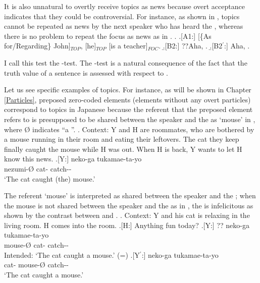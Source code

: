 It is also unnatural to overtly receive topics as news
because overt acceptance indicates that they could be controversial.
For instance, as shown in \Next[B2],
topics cannot be repeated as news by the next speaker who has heard the  \Next[A1],
whereas there is no problem to repeat the focus as news as in \Next[B2$^{\prime}$].
%
\ex.\label{aha} \a.[A1:] [\{As for/Regarding\} John]$_{TOP}$, [he]$_{TOP}$ [is a teacher]$_{FOC}$.
     \b.[B2:] ??Aha, .
     \b.[B2$^{\prime}$:] Aha, .

I call this test the -test.
The -test is a natural consequence of the fact that
the truth value of a sentence is assessed with respect to  \cite{strawson64}.

Let us see specific examples of topics.
For instance,
as will be shown in Chapter \ref{Particles},
preposed zero-coded elements (elements without any overt particles) correspond to topics in Japanese
because the referent that the preposed element refers to is presupposed to be shared between the speaker and the  as  `mouse' in \Next,
where {\O} indicates ``a ''.
	\ex. \label{FrameworkExMouse}Context: Y and H are roommates,
		who are bothered by a mouse running in their room
		and eating their leftovers.
		The cat they keep finally caught the mouse while H was out.
		When H is back, Y wants to let H know this news.
		\ag.[Y:]  neko-ga tukamae-ta-yo \\
			nezumi-{\O} cat- catch-- \\
			`The cat caught (the) mouse.'
	
The referent `mouse' is interpreted as shared between the speaker and the ;
when the mouse is not shared between the speaker and the  as in \Next,
the  is infelicitous as shown by the contrast between \Next[Y] and \Next[Y$^{\prime}$].
	\ex. \label{TopDef}Context: Y and his cat is relaxing in the living room.
		H comes into the room.
		\a.[H:] Anything fun today?
		\bg.[Y:] ?? neko-ga tukamae-ta-yo \\
			mouse-{\O} cat- catch-- \\
			Intended: `The cat caught a mouse.' \hfill{(=\LLast[Y])}
		\bg.[Y$^{\prime}$:] neko-ga  tukamae-ta-yo \\
			cat- mouse-{\O} catch-- \\
			`The cat caught a mouse.'

